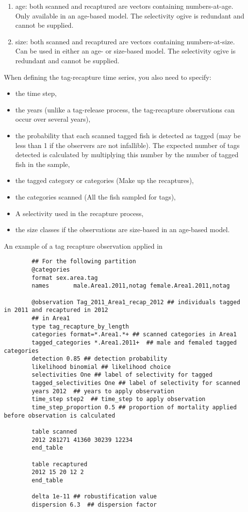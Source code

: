 \begin{enumerate}
	\item age: both scanned and recaptured are vectors containing numbers-at-age. Only available in an age-based model. The selectivity ogive is redundant and cannot be supplied.
	\item size: both scanned and recaptured are vectors containing numbers-at-size. Can be used in either an age- or size-based model. The selectivity ogive is redundant and cannot be supplied.
\end{enumerate}
When defining the tag-recapture time series, you also need to specify:
\begin{itemize}
	\item the time step,
	\item the years (unlike a tag-release process, the tag-recapture observations can occur over several years),
	\item the probability that each scanned tagged fish is detected as tagged (may be less than 1 if the observers are not infallible). The expected number of tags detected is calculated by multiplying this number by the number of tagged fish in the sample,
	\item the tagged category or categories (Make up the recaptures),
	\item the categories scanned (All the fish sampled for tags),
	\item A selectivity used in the recapture process,
	\item the size classes if the observations are size-based in an age-based model.
\end{itemize}


An example of a tag recapture observation applied in \CNAME\,
{\small{\begin{verbatim}
		## For the following partition
		@categories
		format sex.area.tag
		names  		male.Area1.2011,notag female.Area1.2011,notag
		
		@observation Tag_2011_Area1_recap_2012 ## individuals tagged in 2011 and recaptured in 2012
		## in Area1
		type tag_recapture_by_length
		categories format=*.Area1.*+ ## scanned categories in Area1
		tagged_categories *.Area1.2011+  ## male and femaled tagged categories
		detection 0.85 ## detection probability
		likelihood binomial ## likelihood choice
		selectivities One ## label of selectivity for tagged
		tagged_selectivities One ## label of selectivity for scanned
		years 2012  ## years to apply observation
		time_step step2  ## time_step to apply observation	
		time_step_proportion 0.5 ## proportion of mortality applied before observation is calculated 
		
		table scanned
		2012 281271 41360 30239 12234
		end_table
		
		table recaptured
		2012 15 20 12 2
		end_table
		
		delta 1e-11 ## robustification value
		dispersion 6.3	## dispersion factor
		
		\end{verbatim}}}

